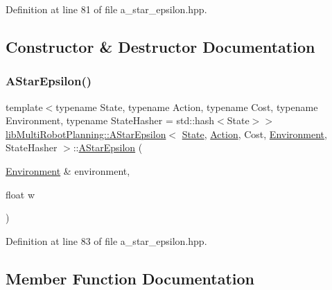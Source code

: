 Definition at line 81 of file a\+\_\+star\+\_\+epsilon.\+hpp.



\subsection{Constructor \& Destructor Documentation}
\mbox{\label{classlib_multi_robot_planning_1_1_a_star_epsilon_a553d070b869a0d33dbbea6f0e95fee1a}} 
\subsubsection{\texorpdfstring{A\+Star\+Epsilon()}{AStarEpsilon()}}
{\footnotesize\ttfamily template$<$typename State, typename Action, typename Cost, typename Environment, typename State\+Hasher = std\+::hash$<$\+State$>$$>$ \\
\hyperlink{classlib_multi_robot_planning_1_1_a_star_epsilon}{lib\+Multi\+Robot\+Planning\+::\+A\+Star\+Epsilon}$<$ \hyperlink{structlib_multi_robot_planning_1_1_state}{State}, \hyperlink{namespacelib_multi_robot_planning_aba73fb71693f86a324adfa0e41e1053d}{Action}, Cost, \hyperlink{classlib_multi_robot_planning_1_1_environment}{Environment}, State\+Hasher $>$\+::\hyperlink{classlib_multi_robot_planning_1_1_a_star_epsilon}{A\+Star\+Epsilon} (\begin{DoxyParamCaption}\item[{\hyperlink{classlib_multi_robot_planning_1_1_environment}{Environment} \&}]{environment,  }\item[{float}]{w }\end{DoxyParamCaption})\hspace{0.3cm}{\ttfamily [inline]}}



Definition at line 83 of file a\+\_\+star\+\_\+epsilon.\+hpp.



\subsection{Member Function Documentation}
\mbox{\label{classlib_multi_robot_planning_1_1_a_star_epsilon_a24eddac1c20a92f7a58d4865b13a0186}} 
